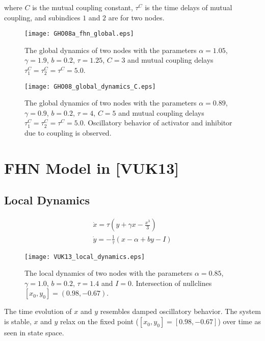 \documentclass[12pt]{article}
\begin{document}
where $C$ is the mutual coupling constant, $\tau^C$ is the time delays of mutual coupling, and subindices $1$ and $2$ are for two nodes. 


\begin{figure}[h!]
	\centering
	\texttt{[image: GHO08a\_fhn\_global.eps]}
		\caption{The global dynamics of two nodes with the parameters $\alpha = 1.05$, $\gamma=1.9$, $b=0.2$, $\tau = 1.25$, $C=3$ and mutual coupling delays $\tau_1^C=\tau_2^C=\tau^C=5.0$.}
\end{figure}

\begin{figure}[h!]
	\centering
	\texttt{[image: GHO08\_global\_dynamics\_C.eps]}
		\caption{The global dynamics of two nodes with the parameters $\alpha = 0.89$, $\gamma=0.9$, $b=0.2$, $\tau = 4$, $C=5$ and mutual coupling delays $\tau_1^C=\tau_2^C=\tau^C=5.0$. Oscillatory behavior of activator and inhibitor due to coupling is observed.}
\end{figure}

\newpage

\section{FHN Model in [VUK13]} 

\subsection{Local Dynamics}
\begin{subequations}
 \begin{align}\dot{x} = \tau (y + \gamma x - \frac{x^3}{3})  \label{eqn: frobenius 17}\\  \dot{y} = -\frac{1}{\tau} (x - \alpha + b y - I ) \label{eqn: frobenius 18}   \end{align} 
\end{subequations}

\begin{figure}[h!]
	\centering
	\texttt{[image: VUK13\_local\_dynamics.eps]}
		\caption{The local dynamics of two nodes with the parameters $\alpha = 0.85$, $\gamma=1.0$, $b=0.2$, $\tau = 1.4$ and $I=0$. Intersection of nullclines $[x_0, y_0] = (0.98,  -0.67)$. }
\end{figure}

The time evolution of $x$ and $y$ resembles damped oscillatory behavior. The system is stable, $x$ and $y$ relax on the fixed point ($[x_0, y_0] = [0.98,  -0.67]$) over time as seen in state space.
\end{document}

